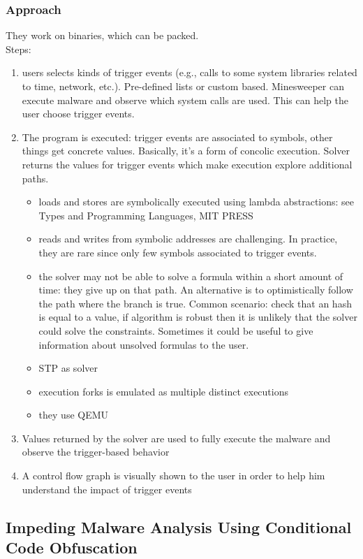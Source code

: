 \documentclass[10pt, a4paper]{article}
\begin{document}
\subsubsection{Approach}
They work on binaries, which can be packed.\\

Steps:
\begin{enumerate}
  \item users selects kinds of trigger events (e.g., calls to some system libraries related to time, network, etc.). Pre-defined lists or custom based. Minesweeper can execute malware and observe which system calls are used. This can help the user choose trigger events.
  \item The program is executed: trigger events are associated to symbols, other things get concrete values. Basically, it's a form of concolic execution. Solver returns the values for trigger events which make execution explore additional paths.
    \begin{itemize}
      \item loads and stores are symbolically executed using lambda abstractions: see Types and Programming Languages, MIT PRESS
      \item reads and writes from symbolic addresses are challenging. In practice, they are rare since only few symbols associated to trigger events.
      \item the solver may not be able to solve a formula within a short amount of time: they give up on that path. An alternative is to optimistically follow the path where the branch is true. Common scenario: check that an hash is equal to a value, if algorithm is robust then it is unlikely that the solver could solve the constraints. Sometimes it could be useful to give information about unsolved formulas to the user.
      \item STP as solver
      \item execution forks is emulated as multiple distinct executions
      \item they use QEMU
    \end{itemize}
  \item Values returned by the solver are used to fully execute the malware and observe the trigger-based behavior
  \item A control flow graph is visually shown to the user in order to help him understand the impact of trigger events
\end{enumerate}

\subsection{\cite{SLG-NDSS08} Impeding Malware Analysis Using Conditional Code Obfuscation} 
\end{document}

